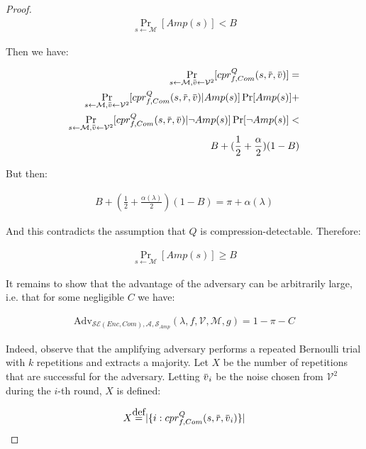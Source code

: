 \documentclass{sig-alternate-05-2015}
\newcommand\defeq{\stackrel{\mathclap{\normalfont\mbox{def}}}{=}}
\newcommand{\overbar}[1]{\mkern 1.5mu\overline{\mkern-1.5mu#1\mkern-1.5mu}\mkern 1.5mu}
\begin{document}
\begin{proof}
\begin{align*}
    \Pr_{s \leftarrow \mathcal{M}}
    [Amp(s)] < B
\end{align*}

Then we have:

\begin{align*}
    \Pr_{s \leftarrow \mathcal{M},
         \overbar{v} \leftarrow \mathcal{V}^2}
         [cpr^Q_{f, Com}(s, \overbar{r}, \overbar{v})]
    =\\
    \Pr_{s \leftarrow \mathcal{M},
         \overbar{v} \leftarrow \mathcal{V}^2}
         [cpr^Q_{f, Com}(s, \overbar{r}, \overbar{v})|Amp(s)]\Pr[Amp(s)]
    +\\
    \Pr_{s \leftarrow \mathcal{M},
         \overbar{v} \leftarrow \mathcal{V}^2}
         [cpr^Q_{f, Com}(s, \overbar{r}, \overbar{v})|\lnot Amp(s)]\Pr[\lnot Amp(s)]
    <\\
    B + (\frac{1}{2} + \frac{\alpha}{2})(1 - B)
\end{align*}

But then:

\begin{align*}
    B + (\frac{1}{2} + \frac{\alpha(\lambda)}{2})(1 - B) =
    \pi + \alpha(\lambda)
\end{align*}

And this contradicts the assumption that $Q$ is compression-detectable. Therefore:

\begin{align*}
    \Pr_{s \leftarrow \mathcal{M}}
    [Amp(s)] \geq B
\end{align*}

It remains to show that the advantage of the adversary can be
arbitrarily large, i.e. that for some negligible $C$ we have:

\begin{align*}
    \text{Adv}_{\mathcal{SE}(Enc, Com), \mathcal{A}, \mathcal{S}_{Amp}}
    (\lambda, f, \mathcal{V}, \mathcal{M}, g) = 1 - \pi - C
\end{align*}

Indeed, observe that the amplifying adversary performs a repeated Bernoulli
trial with $k$ repetitions and extracts a majority. Let $X$ be the number of
repetitions that are successful for the adversary. Letting $\overbar{v}_i$
be the noise chosen from $\mathcal{V}^2$ during the $i$-th round, $X$ is defined:

\begin{align*}
    X \defeq |\{ i: cpr^Q_{f, Com}(s, \overbar{r}, \overbar{v}_i) \}|
\end{align*}


\end{proof}
\end{document}
